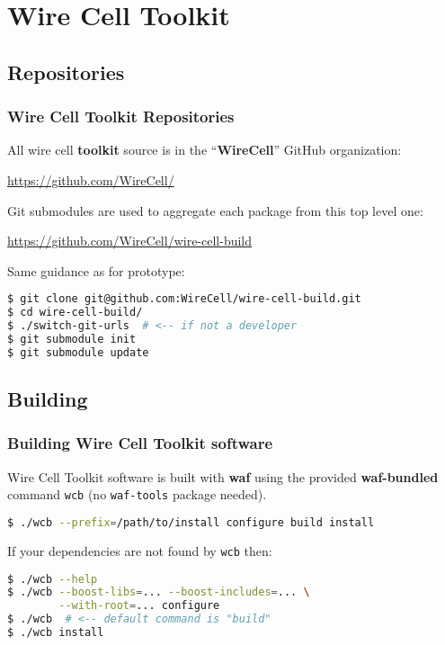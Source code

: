 \documentclass[xcolor=dvipsnames]{beamer}
\begin{document}
\section{Wire Cell Toolkit}

\begin{frame}
\end{frame}



\subsection{Repositories}

\begin{frame}[fragile]
  \frametitle{Wire Cell Toolkit Repositories}

  All wire cell \textbf{toolkit} source is in the ``\textbf{WireCell}'' GitHub organization:

  \begin{center}
    \url{https://github.com/WireCell/}
  \end{center}

  Git submodules are used to aggregate each package from this top level one:

  \begin{center}
    \url{https://github.com/WireCell/wire-cell-build}
  \end{center}

  Same guidance as for prototype:

\begin{lstlisting}[language=sh]
$ git clone git@github.com:WireCell/wire-cell-build.git
$ cd wire-cell-build/
$ ./switch-git-urls  # <-- if not a developer
$ git submodule init
$ git submodule update
\end{lstlisting}

\end{frame}

\subsection{Building}

\begin{frame}[fragile]
  \frametitle{Building Wire Cell Toolkit software}
  
  Wire Cell Toolkit software is built with \textbf{waf} using the
  provided \textbf{waf-bundled} command \texttt{wcb} (no \texttt{waf-tools} package needed).

\begin{lstlisting}[language=sh]
$ ./wcb --prefix=/path/to/install configure build install
\end{lstlisting}

If your dependencies are not found by \texttt{wcb} then:

\begin{lstlisting}[language=sh]
$ ./wcb --help
$ ./wcb --boost-libs=... --boost-includes=... \
        --with-root=... configure
$ ./wcb  # <-- default command is "build"
$ ./wcb install
\end{lstlisting}

\end{frame}
\end{document}
